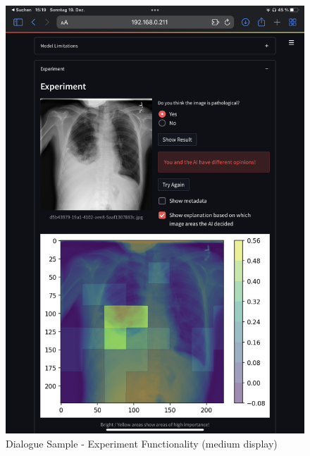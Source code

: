 \documentclass[11pt,a4paper,english]{scrreprt}
\begin{document}
\begin{figure}[htbp]
    \centering
    \includegraphics[width=\textwidth]{img/screenshots/samples/medium/m_occlusion.PNG}
    \caption{Dialogue Sample - Experiment Functionality (medium display)}
    \label{fig:samples_m_experiment}
\end{figure}
\end{document}
